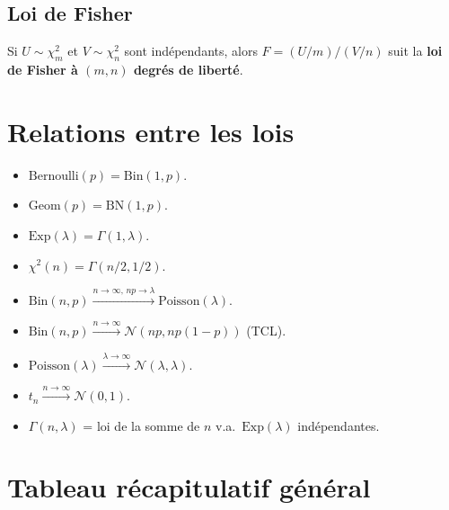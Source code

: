 \subsection{Loi de Fisher}

\begin{definition}[Fisher]
Si $U \sim \chi^2_m$ et $V \sim \chi^2_n$ sont ind\'ependants, alors
$F = (U/m)/(V/n)$ suit la \textbf{loi de Fisher \`a $(m, n)$ degr\'es de libert\'e}.
\end{definition}

\section{Relations entre les lois}

\begin{formules}[title=\textbf{Carte des relations entre lois}]
\begin{itemize}
    \item $\text{Bernoulli}(p) = \text{Bin}(1, p)$.
    \item $\text{Geom}(p) = \text{BN}(1, p)$.
    \item $\text{Exp}(\lambda) = \Gamma(1, \lambda)$.
    \item $\chi^2(n) = \Gamma(n/2, 1/2)$.
    \item $\text{Bin}(n, p) \xrightarrow{n\to\infty,\, np\to\lambda} \text{Poisson}(\lambda)$.
    \item $\text{Bin}(n, p) \xrightarrow{n\to\infty} \mathcal{N}(np, np(1-p))$ \quad (TCL).
    \item $\text{Poisson}(\lambda) \xrightarrow{\lambda\to\infty} \mathcal{N}(\lambda, \lambda)$.
    \item $t_n \xrightarrow{n\to\infty} \mathcal{N}(0,1)$.
    \item $\Gamma(n, \lambda)$ = loi de la somme de $n$ v.a.\ $\text{Exp}(\lambda)$ ind\'ependantes.
\end{itemize}
\end{formules}

\section{Tableau r\'ecapitulatif g\'en\'eral}

